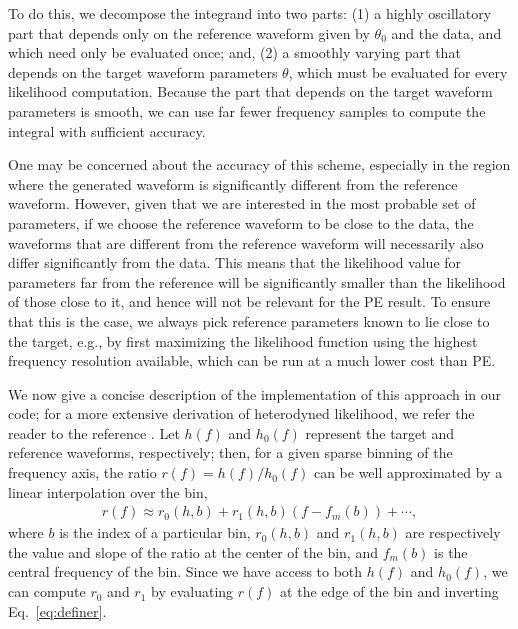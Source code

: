\documentclass[twocolumn]{aastex631}
\begin{document}
To do this, we decompose the integrand into two parts: (1) a highly oscillatory
part that depends only on the reference waveform given by $\theta_0$ and
the data, and which need only be evaluated once; and, (2) a smoothly
varying part that depends on the target waveform parameters $\theta$, which
must be evaluated for every likelihood computation. Because the part
that depends on the target waveform parameters is smooth, we can use far fewer
frequency samples to compute the integral with sufficient accuracy.

One may be concerned about the accuracy of this scheme, especially in the
region where the generated waveform is significantly different from the
reference waveform. However, given that we are interested in the most probable
set of parameters, if we choose the reference waveform to be close to the data,
the waveforms that are different from the reference waveform will necessarily
also differ significantly from the data. This means that the likelihood value
for parameters far from the reference will be significantly smaller than the
likelihood of those close to it, and hence will not be relevant for the PE
result. To ensure that this is the case, we always pick reference parameters
known to lie close to the target, e.g., by first maximizing the likelihood
function using the highest frequency resolution available, which can be run at
a much lower cost than PE. 

We now give a concise description of the implementation of this approach in our
code; for a more extensive derivation of heterodyned likelihood, we refer the
reader to the reference \cite{Zackay:2018qdy}. Let $h(f)$ and $h_0(f)$
represent the target and reference waveforms, respectively; then, for a given
sparse binning of the frequency axis, the ratio $r(f) = h(f)/h_0(f)$ can be
well approximated by a linear interpolation over the bin,
\begin{align}
r(f) \approx r_0(h,b) + r_1(h,b)(f- f_m(b)) + \cdots,
\label{eq:definer}
\end{align}
where $b$ is the index of a particular bin, $r_0(h,b)$ and $r_1(h,b)$ are
respectively the value and slope of the ratio at the center of the bin, and
$f_m(b)$ is the central frequency of the bin. Since we have access to both
$h(f)$ and $h_0(f)$, we can compute $r_0$ and $r_1$ by evaluating $r(f)$ at the
edge of the bin and inverting Eq.~\eqref{eq:definer}.
\end{document}

